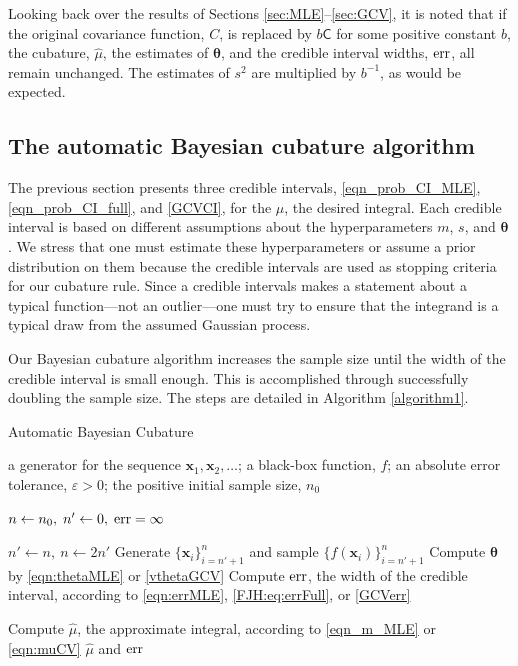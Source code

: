 \documentclass[twocolumn]{svjour3}          %
\newcommand{\bm}[1]{\boldsymbol{#1}}
\newcommand{\vtheta}{{\bm{\theta}}}
\newcommand{\vx}{\bm{x}}
\newcommand{\mC}{\mathsf{C}}
\newcommand{\hmu}{\widehat{\mu}}
\newcommand{\err}{\textup{err}}
\begin{document}
Looking back over the results of Sections  \ref{sec:MLE}--\ref{sec:GCV}, it is noted that if  the original covariance function, $C$, is replaced by $b \mC$ for some positive constant $b$, the cubature, $\hmu$, the estimates of $\vtheta$, and the credible interval widths, $\err$, all remain unchanged.  The estimates of $s^2$ are multiplied by $b^{-1}$, as would be expected. 


\subsection{The automatic Bayesian cubature algorithm}
\label{sec:bayes_cubature_algo}
The previous section presents three credible intervals, \eqref{eqn_prob_CI_MLE}, \eqref{eqn_prob_CI_full}, and \eqref{GCVCI}, for the $\mu$, the desired integral.  Each credible interval is based on different assumptions about the hyperparameters $m$, $s$, and $\vtheta$.  We stress that one must estimate these hyperparameters or assume a prior distribution on them because the credible intervals are used as stopping criteria for our cubature rule.  Since a credible intervals makes a statement about a typical function---not an outlier---one must try to ensure that the integrand is a typical draw from the assumed Gaussian process.

Our  Bayesian cubature algorithm increases the sample size until the width of the credible interval is small enough.  This is accomplished through successfully doubling the sample size.  The steps are detailed in Algorithm \ref{algorithm1}.

\begin{algorithm}
\caption{Automatic Bayesian Cubature}\label{algorithm1}
  \begin{algorithmic}[1]
  	\Require a generator for the sequence
  	$\vx_1, \vx_2, \ldots$; a black-box function, $f$; an absolute error tolerance,
  	$\varepsilon>0$; the positive initial sample size, $n_0$
  	
      \State $n \gets n_0, \; n' \gets 0, \; \err = \infty$
      
      \While{$\err > \varepsilon$}

			$n' \gets n, \ n\gets 2 n'$
		\EndIf
        \State\label{LoopStart}Generate $\{ \vx_i\}_{i=n' + 1}^{n}$ and sample $\{f(\vx_i)\}_{i=n'+1}^{n}$
        \State Compute $\vtheta$ by \eqref{eqn:thetaMLE} or \eqref{vthetaGCV}
        \State Compute $\err$, the width of the credible interval,  according to \eqref{eqn:errMLE}, \eqref{FJH:eq:errFull}, or \eqref{GCVerr}
        
        \EndWhile
        
        \State Compute $\hmu$, the approximate integral,   according to \eqref{eqn_m_MLE} or \eqref{eqn:muCV}
      \State \Return $\hmu$  and $\err$

  \end{algorithmic}
\end{algorithm}
\end{document}
